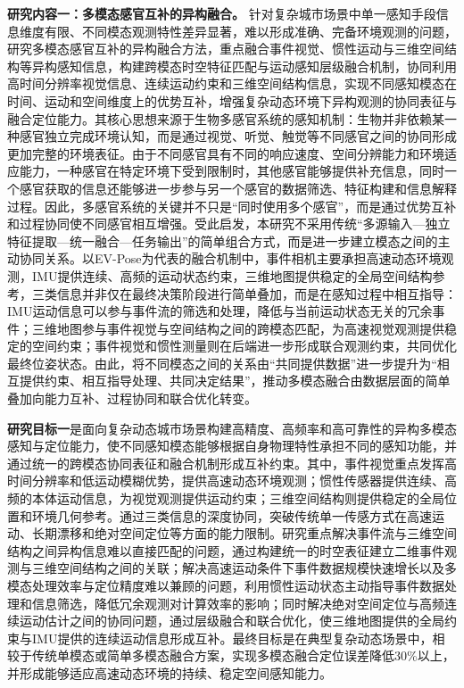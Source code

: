 \textbf{研究内容一：多模态感官互补的异构融合。} 针对复杂城市场景中单一感知手段信息维度有限、不同模态观测特性差异显著，难以形成准确、完备环境观测的问题，研究多模态感官互补的异构融合方法，重点融合事件视觉、惯性运动与三维空间结构等异构感知信息，构建跨模态时空特征匹配与运动感知层级融合机制，协同利用高时间分辨率视觉信息、连续运动约束和三维空间结构信息，实现不同感知模态在时间、运动和空间维度上的优势互补，增强复杂动态环境下异构观测的协同表征与融合定位能力。其核心思想来源于生物多感官系统的感知机制：生物并非依赖某一种感官独立完成环境认知，而是通过视觉、听觉、触觉等不同感官之间的协同形成更加完整的环境表征。由于不同感官具有不同的响应速度、空间分辨能力和环境适应能力，一种感官在特定环境下受到限制时，其他感官能够提供补充信息，同时一个感官获取的信息还能够进一步参与另一个感官的数据筛选、特征构建和信息解释过程。因此，多感官系统的关键并不只是“同时使用多个感官”，而是通过优势互补和过程协同使不同感官相互增强。受此启发，本研究不采用传统“多源输入—独立特征提取—统一融合—任务输出”的简单组合方式，而是进一步建立模态之间的主动协同关系。以EV-Pose为代表的融合机制中，事件相机主要承担高速动态环境观测，IMU提供连续、高频的运动状态约束，三维地图提供稳定的全局空间结构参考，三类信息并非仅在最终决策阶段进行简单叠加，而是在感知过程中相互指导：IMU运动信息可以参与事件流的筛选和处理，降低与当前运动状态无关的冗余事件；三维地图参与事件视觉与空间结构之间的跨模态匹配，为高速视觉观测提供稳定的空间约束；事件视觉和惯性测量则在后端进一步形成联合观测约束，共同优化最终位姿状态。由此，将不同模态之间的关系由“共同提供数据”进一步提升为“相互提供约束、相互指导处理、共同决定结果”，推动多模态融合由数据层面的简单叠加向能力互补、过程协同和联合优化转变。

\textbf{研究目标一}是面向复杂动态城市场景构建高精度、高频率和高可靠性的异构多模态感知与定位能力，使不同感知模态能够根据自身物理特性承担不同的感知功能，并通过统一的跨模态协同表征和融合机制形成互补约束。其中，事件视觉重点发挥高时间分辨率和低运动模糊优势，提供高速动态环境观测；惯性传感器提供连续、高频的本体运动信息，为视觉观测提供运动约束；三维空间结构则提供稳定的全局位置和环境几何参考。通过三类信息的深度协同，突破传统单一传感方式在高速运动、长期漂移和绝对空间定位等方面的能力限制。研究重点解决事件流与三维空间结构之间异构信息难以直接匹配的问题，通过构建统一的时空表征建立二维事件观测与三维空间结构之间的关联；解决高速运动条件下事件数据规模快速增长以及多模态处理效率与定位精度难以兼顾的问题，利用惯性运动状态主动指导事件数据处理和信息筛选，降低冗余观测对计算效率的影响；同时解决绝对空间定位与高频连续运动估计之间的协同问题，通过层级融合和联合优化，使三维地图提供的全局约束与IMU提供的连续运动信息形成互补。最终目标是在典型复杂动态场景中，相较于传统单模态或简单多模态融合方案，实现多模态融合定位误差降低30\%以上，并形成能够适应高速动态环境的持续、稳定空间感知能力。

